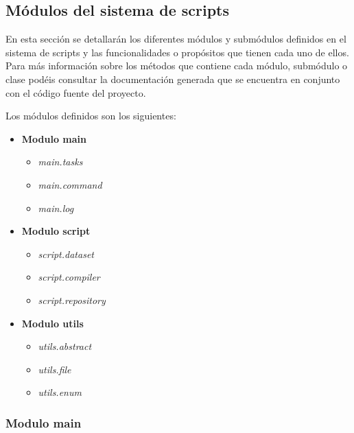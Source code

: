\subsection{Módulos del sistema de scripts}
\label{subsec:modulos_sistema_scripts}


En esta sección se detallarán los diferentes módulos y submódulos definidos en el sistema de scripts y las
funcionalidades o propósitos que tienen cada uno de ellos. Para más información sobre los métodos que contiene
cada módulo, submódulo o clase podéis consultar la documentación generada que se encuentra en conjunto con
el código fuente del proyecto.

Los módulos definidos son los siguientes:

\begin{itemize}
    \item \textbf{Modulo main}
    \begin{itemize}
        \item \textit{main.tasks}
        \item \textit{main.command}
        \item \textit{main.log}
    \end{itemize}
    \item \textbf{Modulo script}
    \begin{itemize}
        \item \textit{script.dataset}
        \item \textit{script.compiler}
        \item \textit{script.repository}
    \end{itemize}
    \item \textbf{Modulo utils}
    \begin{itemize}
        \item \textit{utils.abstract}
        \item \textit{utils.file}
        \item \textit{utils.enum}
    \end{itemize}
\end{itemize}

\subsubsection{Modulo main}
\label{subsubsec:modulo_main}


